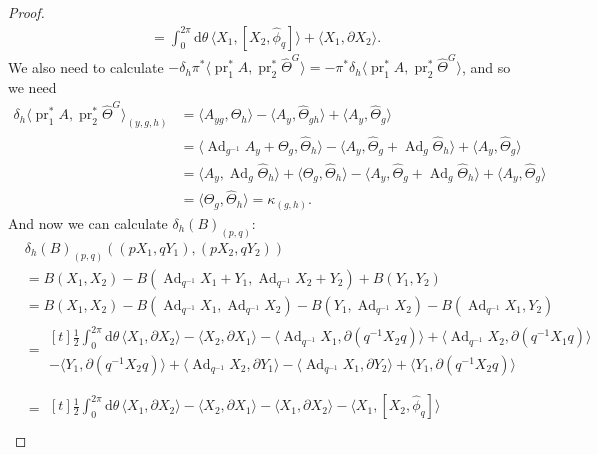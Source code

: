 \documentclass[10pt,a4paper]{amsart}
\DeclareMathOperator{\Ad}{Ad}
\newcommand{\Thetahat}{\widehat{\Theta}}
\newcommand{\intSone}{\int_{0}^{2\pi}\mathrm{d}\theta\,}
\newcommand{\phihat}{\widehat{\phi}}
\DeclareMathOperator{\pr}{pr}
\begin{document}
\begin{proof}
\begin{align*}
& = \intSone \langle X_1,[X_2,\phihat_q]\rangle + \langle X_1,\partial X_2\rangle.
\end{align*}
We also need to calculate $-\delta_h \pi^*\langle\pr_1^*A, \pr_2^* \Thetahat^G\rangle = -\pi^* \delta_h\langle\pr_1^*A, \pr_2^* \Thetahat^G\rangle$, and so we need
\begin{align*}
  \delta_h\langle\pr_1^*A, \pr_2^* \Thetahat^G\rangle_{(y,g,h)}&=\langle A_{yg},\Thetahat_h\rangle - \langle A_y,\Thetahat_{gh}\rangle 
  + \langle A_y,\Thetahat_g\rangle\\
  &=\langle \Ad_{g^{-1}}A_y + \Theta_g,\Thetahat_h \rangle
  - \langle A_y,\Thetahat_g+\Ad_g\Thetahat_{h}\rangle 
  + \langle A_y,\Thetahat_g\rangle\\
  &= \langle A_y,\Ad_g\Thetahat_h\rangle + \langle\Theta_g,\Thetahat_h \rangle
  - \langle A_y,\Thetahat_g+\Ad_g\Thetahat_{h}\rangle 
  + \langle A_y,\Thetahat_g\rangle\\
  & = \langle\Theta_g,\Thetahat_h \rangle = \kappa_{(g,h)}.
\end{align*}
And now we can calculate $\delta_h(B)_{(p,q)}$:
\begin{align*}
&\delta_h(B)_{(p,q)}\left((pX_1,qY_1),(pX_2,qY_2)\right) \\
& = B(X_1,X_2) - B(\Ad_{q^{-1}}X_1+Y_1,\Ad_{q^{-1}}X_2+Y_2) + B(Y_1,Y_2)\\
 & = B(X_1,X_2)- B(\Ad_{q^{-1}}X_1,\Ad_{q^{-1}}X_2)
- B( Y_1,\Ad_{q^{-1}}X_2)
- B(\Ad_{q^{-1}}X_1, Y_2)
\\
& = \begin{multlined}[t]
\frac12 \intSone \langle X_1,\partial X_2\rangle - \langle X_2,\partial X_1\rangle  
-\langle\Ad_{q^{-1}}X_1,\partial(q^{-1}X_2q)\rangle
+\langle\Ad_{q^{-1}}X_2,\partial(q^{-1}X_1q)\rangle\\
- \langle Y_1, \partial(q^{-1}X_2q)\rangle + 
\langle \Ad_{q^{-1}}X_2 , \partial Y_1\rangle 
-\langle \Ad_{q^{-1}}X_1 , \partial Y_2\rangle
+ \langle Y_1, \partial(q^{-1}X_2q)\rangle 
\end{multlined}\\
\\
&=\begin{multlined}[t]
\frac12 \intSone \langle X_1,\partial X_2\rangle - \langle X_2,\partial X_1\rangle - \langle X_1,\partial X_2\rangle - \langle X_1,[X_2,\phihat_q] \rangle\\

\end{multlined}
\end{align*}
\end{proof}
\end{document}
